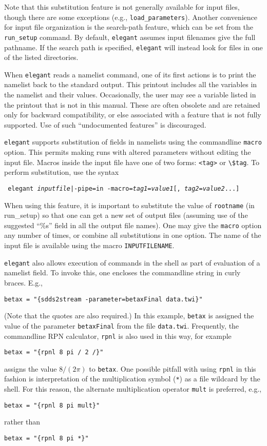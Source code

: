 \documentclass[11pt]{article}
\begin{document}
Note that this substitution feature is not generally available for
input files, though there are some exceptions (e.g., \verb|load_parameters|).
Another convenience for input file organization is the search-path feature,
which can be set from the \verb|run_setup| command.
By default, \verb|elegant| assumes input filenames give the full pathname.
If the search path is specified, \verb|elegant| will instead look for files in one of
the listed directories.

When {\tt elegant} reads a namelist command, one of its first actions
is to print the namelist back to the standard output.  This printout
includes all the variables in the namelist and their values.
Occasionally, the user may see a variable listed in the printout that
is not in this manual.  These are often obsolete and are retained only
for backward compatibility, or else associated with a feature that is
not fully supported.  Use of such ``undocumented features'' is
discouraged.

{\tt elegant} supports substitution of fields in namelists using the
commandline {\tt macro} option.  This permits making runs with altered
parameters without editing the input file.  Macros inside the input
file have one of two forms: \verb|<tag>| or \verb|\$tag|.  To perform
substitution, use the syntax
\begin{flushleft}{\tt
elegant {{\em inputfile}|-pipe=in} -macro={\em tag1}={\em value1}[,{\em
tag2}={\em value2}...]  }\end{flushleft} 
When using this feature, it
is important to substitute the value of {\tt rootname} (in run\_setup)
so that one can get a new set of output files (assuming use of the
suggested ``\%s'' field in all the output file names).
One may give the {\tt macro} option any number of times, or combine
all substitutions in one option.  The name of the input file is available
using the macro \verb|INPUTFILENAME|.

{\tt elegant} also allows execution of commands in the shell as part of
evaluation of a namelist field.  To invoke this, one encloses the commandline
string in curly braces.  E.g., 
\begin{verbatim}
betax = "{sdds2stream -parameter=betaxFinal data.twi}"
\end{verbatim}
(Note that the quotes are also required.)
In this example, \verb|betax| is assigned the value of the parameter {\tt betaxFinal} from
the file {\tt data.twi}.
Frequently, the commandline RPN calculator, {\tt rpnl} is also used in this way, for example
\begin{verbatim}
betax = "{rpnl 8 pi / 2 /}"
\end{verbatim}
assigns the value $8/(2 \pi)$ to {\tt betax}. One possible pitfall with using \verb|rpnl| in this
fashion is interpretation of the multiplication symbol (\verb|*|) as a file wildcard by the
shell.  For this reason, the alternate multiplication operator \verb|mult| is preferred, e.g.,
\begin{verbatim}
betax = "{rpnl 8 pi mult}"
\end{verbatim}
rather than
\begin{verbatim}
betax = "{rpnl 8 pi *}"
\end{verbatim}
\end{document}
